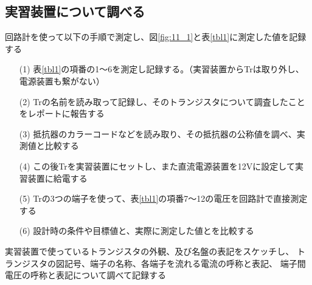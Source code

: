 \documentclass[uplatex,a4paper,11pt,oneside,openany]{jsbook}
\begin{document}
\subsection{実習装置について調べる}

回路計を使って以下の手順で測定し、図\ref{fig:11_1}と表\ref{tbl1}に測定した値を記録する

\begin{enumerate}
	\item[(1)] 表\ref{tbl1}の項番の1〜6を測定し記録する。（実習装置からTrは取り外し、電源装置も繋がない）
	\item[(2)] Trの名前を読み取って記録し、そのトランジスタについて調査したことをレポートに報告する
	\item[(3)] 抵抗器のカラーコードなどを読み取り、その抵抗器の公称値を調べ、実測値と比較する
	\item[(4)] この後Trを実習装置にセットし、また直流電源装置を12Vに設定して実習装置に給電する
	\item[(5)] Trの3つの端子を使って、表\ref{tbl1}の項番7〜12の電圧を回路計で直接測定する
	\item[(6)] 設計時の条件や目標値と、実際に測定した値とを比較する
\end{enumerate}

実習装置で使っているトランジスタの外観、及び名盤の表記をスケッチし、
トランジスタの図記号、端子の名称、各端子を流れる電流の呼称と表記、
端子間電圧の呼称と表記について調べて記録する\\

\end{document}
